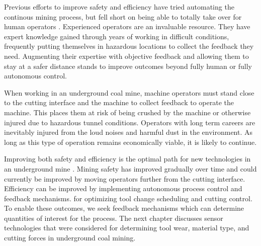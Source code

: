 Previous efforts to improve safety and efficiency have tried automating the continous mining process,
but fell short on being able to totally take over for human operators \cite{11124/170545, schiffbauer1988testbed}. 
Experienced operators are an invaluable resource. 
They have expert knowledge gained through years of working in difficult conditions,
frequently putting themselves in hazardous locations to collect the feedback they need.
Augmenting their expertise with objective feedback and allowing them to stay at a safer distance
stands to improve outcomes beyond fully human or fully autonomous control.

When working in an underground coal mine, machine operators must stand close to the cutting interface
and the machine to collect feedback to operate the machine. This places them at risk of being crushed 
by the machine or otherwise injured due to hazardous tunnel conditions.
Operators with long term careers are inevitably injured from the loud noises and harmful dust in the environment.
As long as this type of operation remains economically viable, it is likely to continue.

Improving both safety and efficiency is the optimal path for new technologies in an underground mine \cite{Sider1983}.
Mining safety has improved gradually over time and could currently 
be improved by moving operators further from the cutting interface.
Efficiency can be improved by implementing autonomous process control and feedback mechanisms.
for optimizing tool change scheduling and cutting control.
To enable these outcomes, we seek feedback mechanisms which can determine quantities of interest for the process.
The next chapter discusses sensor technologies that were considered for 
determining tool wear, material type, and cutting forces in underground coal mining.

